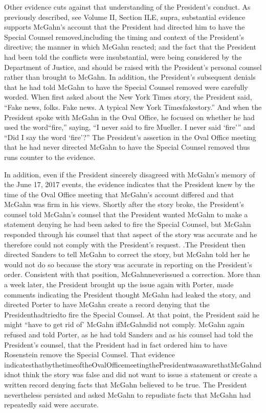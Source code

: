 Other evidence cuts against that understanding of the President's conduct. As previously described, see Volume II, Section ILE, supra, substantial evidence supports McGahn's account that the President had directed him to have the Special Counsel removed,including the timing and context of the President's directive; the manner in which McGahn reacted; and the fact that the President had been told the conflicts were insubstantial, were being considered by the Department of Justice, and should be raised with the President's personal counsel rather than brought to McGahn. In addition, the President's subsequent denials that he had told McGahn to have the Special Counsel removed were carefully worded. When first asked about the New York Times story, the President said, “Fake news, folks. Fake news. A typical New York Timesfakestory.” And when the President spoke with McGahn in the Oval Office, he focused on whether he had used the word“fire,” saying, “I never said to fire Mueller. I never said ‘fire'” and “Did I say the word ‘fire'?” The President's assertion in the Oval Office meeting that he had never directed McGahn to have the Special Counsel removed thus runs counter to the evidence.

In addition, even if the President sincerely disagreed with McGahn's memory of the June 17, 2017 events, the evidence indicates that the President knew by the time of the Oval Office
meeting that McGahn's account differed and that McGahn was firm in his views. Shortly after the story broke, the President's counsel told McGahn's counsel that the President wanted McGahn to make a statement denying he had been asked to fire the Special Counsel, but McGahn responded through his counsel that that aspect of the story was accurate and he therefore could not comply with the President's request. .The President then directed Sanders to tell McGahn to correct the story, but McGahn told her he would not do so because the story was accurate in reporting on the President's order. Consistent with that position, McGahnneverissued a correction. More than a week later, the President brought up the issue again with Porter, made comments indicating the President thought McGahn had leaked the story, and directed Porter to have McGahn create a record denying that the Presidenthadtriedto fire the Special Counsel. At that point, the President said he might “have to get rid of' McGahn ifMcGahndid not comply. McGahn again refused and told Porter, as he had told Sanders and as his counsel had told the President's counsel, that the President had in fact ordered him to have Rosenstein remove the Special Counsel. That evidence indicatesthatbythetimeoftheOvalOfficemeetingthePresidentwasawarethatMcGahndidnot think the story was false and did not want to issue a statement or create a written record denying facts that McGahn believed to be true. The President nevertheless persisted and asked McGahn to repudiate facts that McGahn had repeatedly said were accurate.


